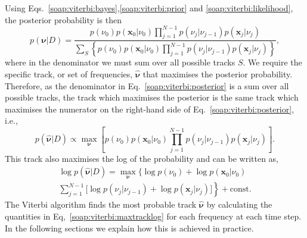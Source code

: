 Using Eqs.~\ref{soap:viterbi:bayes},\ref{soap:viterbi:prior} and
\ref{soap:viterbi:likelihood}, the posterior probability is then
%
\begin{equation}
\label{soap:viterbi:posterior}
    p({\bm \nu} | D) =
    \frac{p(\nu_0)p({\bm x_0} | \nu_0) \displaystyle\prod_{j=1}^{N-1}p(\nu_{j}
| \nu_{j-1})p({\bm x_j} | \nu_j)}{\displaystyle\sum_{S}
\left\{p(\nu_0)p({\bm x_0} | \nu_0)\displaystyle\prod_{j=1}^{N-1}p(\nu_{j} |
\nu_{j-1})p({\bm x_j} | \nu_j)\right\}} ,
\end{equation}
%
where in the denominator we must sum over all possible tracks
$S$. We require the specific track, or set of frequencies, $\hat{\bm
\nu}$ that  maximises the posterior probability. Therefore, as the denominator in Eq.~\ref{soap:viterbi:posterior} is a sum over all possible tracks, the track which maximises the posterior is the same track which
maximises the numerator  on the right-hand side of  Eq.~\ref{soap:viterbi:posterior}, i.e.,
%
\begin{equation}
\label{soap:viterbi:maxtrack}
  p(\hat{\bm \nu} | D) \propto \max_{\bm \nu}{\left[p(\nu_0)p({\bm x_0} |
\nu_0) \prod_{j=1}^{N-1}p(\nu_{j} |\nu_{j-1})p({\bm x_j} | \nu_j)\right]}.
\end{equation}
%
This track also maximises the log of the probability and can be written as,
%
\begin{equation}
\label{soap:viterbi:maxtracklog}
\begin{split}
  \log p(\hat{\bm \nu} | D)  = \max_{{\bm \nu}}{\biggl\{ \log p(\nu_0) + \log p({\bm x_0} | \nu_0)  } \\
 \left. \sum_{j=1}^{N-1} \biggl[ \log p(\nu_{j} | \nu_{j-1}) + \log p({\bm x_j}
| \nu_j) \biggr] \right\} + \text{const}.
  \end{split}
\end{equation}
%
The Viterbi algorithm finds the most probable track $\hat{\bm \nu}$ by calculating the quantities in Eq,~\ref{soap:viterbi:maxtracklog} for each frequency at each time step. In the following sections we explain how this is achieved in practice.

